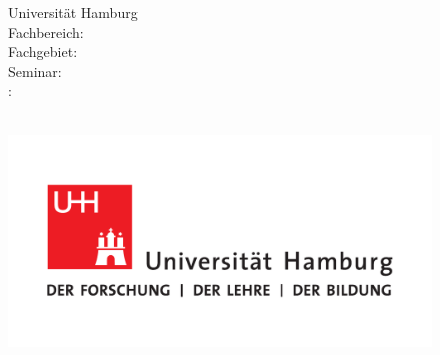 
\begin{titlepage}

\setcounter{page}{-1}    

\begin{figure}[h]
	\begin{minipage}[t]{8.5cm}
	\flushleft 
			Universität Hamburg \\
			Fachbereich: \fachbereich \\
			Fachgebiet: \fachgebiet \\
			Seminar: \courseOfStudies \\ 
			\supervisorType:  \\
			\currentSemester \\
	\end{minipage}
	\hfill
   \begin{minipage}[t][2cm][b]{0.35\textwidth}
    \flushright\noindent
    	\noindent\includegraphics[scale=0.3]{images/UHH-Logo_2010_Farbe_CMYK.pdf}
    \end{minipage}
\end{figure}


\end{titlepage}
